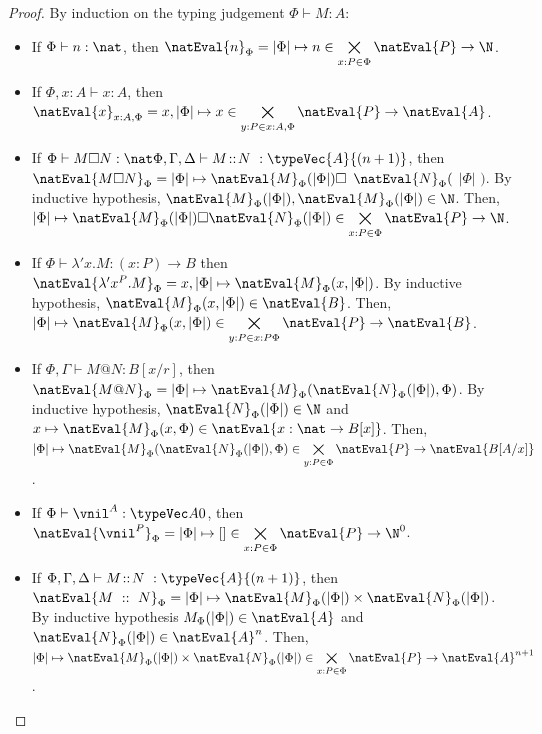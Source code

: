 \begin{proof}
    By induction on the typing judgement $\Phi \vdash M : A$:
    \begin{itemize}
        \item If $\Phi\vdash n:\nat$, then $\natEval{n}_\Phi = |\Phi| \mapsto n \in  \bigtimes\limits_{x:P \in \Phi} \natEval{P} \to \N$.

        \item If $\Phi, x:A\vdash x:A$, then $\natEval{x}_{x:A, \Phi} = x,|\Phi| \mapsto x \in \bigtimes\limits_{y:P \in x:A,\Phi} \natEval{P} \to \natEval{A}$.

        \item If $\Phi\vdash M\square N:\nat\Phi,\Gamma,\Delta\vdash M\!::\!N\ :\typeVec{A}{(n+1)}$, then $\natEval{M \square N}_\Phi = |\Phi| \mapsto \natEval{M}_\Phi(|\Phi|) \square$
        $\natEval{N}_\Phi($ $|\Phi|$ $)$. By inductive hypothesis, $\natEval{M}_\Phi(|\Phi|), \natEval{M}_\Phi(|\Phi|)\in \N$. Then,
        $|\Phi| \mapsto \natEval{M}_\Phi(|\Phi|) \square \natEval{N}_\Phi(|\Phi|)\in \bigtimes\limits_{x:P \in \Phi} \natEval{P} \to \N$.
        
        \item If $\Phi\vdash\lambda' x.M:(x:P)\to B$ then $\natEval{\lambda' x^P.M}_\Phi = x,|\Phi| \mapsto \natEval{M}_\Phi(x,|\Phi|)$. By inductive hypothesis, $\natEval{M}_\Phi(x,|\Phi|)\in \natEval{B}$. Then, $|\Phi| \mapsto \natEval{M}_\Phi(x,|\Phi|)\in \bigtimes\limits_{y:P \in x:P\Phi} \natEval{P} \to \natEval{B}$.

        \item If $\Phi,\Gamma\vdash M @ N:B[x/r]$, then $\natEval{M @ N}_\Phi = |\Phi| \mapsto\natEval{M}_\Phi(\natEval{N}_\Phi(|\Phi|), \Phi)$. By inductive hypothesis, $\natEval{N}_\Phi(|\Phi|)\in \N$ and $x\mapsto\natEval{M}_\Phi(x, \Phi)\in \natEval{x:\nat\to B[x]}$. Then, $|\Phi|\mapsto\natEval{M}_\Phi(\natEval{N}_\Phi(|\Phi|), \Phi) \in \bigtimes\limits_{y:P \in \Phi} \natEval{P} \to \natEval{B[A/x]}$.

        \item If $\Phi\vdash \vnil^A:\typeVec A 0$, then $\natEval{\vnil^P}_{\Phi} = |\Phi| \mapsto []\in \bigtimes\limits_{x:P \in \Phi} \natEval{P} \to \N^0$.

        \item If $\Phi,\Gamma,\Delta\vdash M\!::\!N\ :\typeVec{A}{(n+1)}$, then $\natEval{M\ ::\ N}_{\Phi} = |\Phi| \mapsto \natEval{M}_\Phi(|\Phi|) \times \natEval{N}_\Phi(|\Phi|)$. By inductive hypothesis ${M}_\Phi(|\Phi|)\in\natEval{A}$ and $\natEval{N}_\Phi(|\Phi|)\in\natEval{A}^n$. Then, $|\Phi| \mapsto \natEval{M}_\Phi(|\Phi|) \times \natEval{N}_\Phi(|\Phi|)\in\bigtimes\limits_{x:P \in \Phi} \natEval{P} \to \natEval{A}^{n+1}$.


\end{itemize}
\end{proof}
